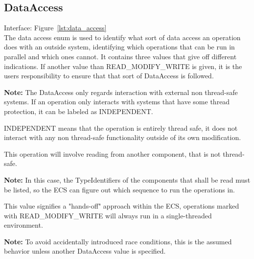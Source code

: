 \subsection{DataAccess}
Interface: Figure~\ref{lst:data_access}\\\noindent
The data access enum is used to identify what sort of data access an operation does with an outside system,
identifying which operations that can be run in parallel and which ones cannot.
It contains three values that give off different indications.
If another value than READ\_MODIFY\_WRITE is given, it is the users responsibility to ensure that that sort of DataAccess is followed.

\textbf{Note:} The DataAccess only regards interaction with external non thread-safe systems.
If an operation only interacts with systems that have some thread protection, it can be labeled as INDEPENDENT.

INDEPENDENT means that the operation is entirely thread safe, it does not interact with any non thread-safe functionality outside of its own modification.

This operation will involve reading from another component, that is not thread-safe.

\textbf{Note:} In this case, the TypeIdentifiers of the components that shall be read must be listed, so the ECS can figure out which sequence to run the operations in.

This value signifies a "hands-off" approach within the ECS,
operations marked with READ\_MODIFY\_WRITE will always run in a single-threaded environment.

\textbf{Note:} To avoid accidentally introduced race conditions, this is the assumed behavior unless another DataAccess value is specified.
